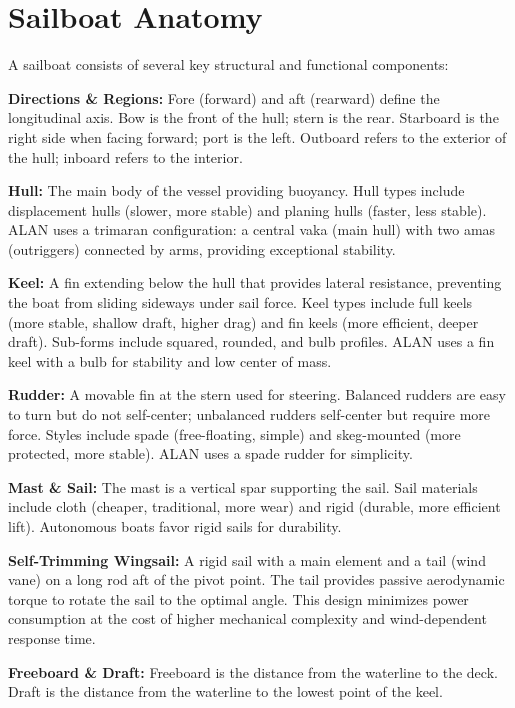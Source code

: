 
\section{Sailboat Anatomy}
\label{app:sailboat_anatomy}

A sailboat consists of several key structural and functional components:

\textbf{Directions \& Regions:} Fore (forward) and aft (rearward) define the longitudinal axis. Bow is the front of the hull; stern is the rear. Starboard is the right side when facing forward; port is the left. Outboard refers to the exterior of the hull; inboard refers to the interior.

\textbf{Hull:} The main body of the vessel providing buoyancy. Hull types include displacement hulls (slower, more stable) and planing hulls (faster, less stable). ALAN uses a trimaran configuration: a central vaka (main hull) with two amas (outriggers) connected by arms, providing exceptional stability.

\textbf{Keel:} A fin extending below the hull that provides lateral resistance, preventing the boat from sliding sideways under sail force. Keel types include full keels (more stable, shallow draft, higher drag) and fin keels (more efficient, deeper draft). Sub-forms include squared, rounded, and bulb profiles. ALAN uses a fin keel with a bulb for stability and low center of mass.

\textbf{Rudder:} A movable fin at the stern used for steering. Balanced rudders are easy to turn but do not self-center; unbalanced rudders self-center but require more force. Styles include spade (free-floating, simple) and skeg-mounted (more protected, more stable). ALAN uses a spade rudder for simplicity.

\textbf{Mast \& Sail:} The mast is a vertical spar supporting the sail. Sail materials include cloth (cheaper, traditional, more wear) and rigid (durable, more efficient lift). Autonomous boats favor rigid sails for durability.

\textbf{Self-Trimming Wingsail:} A rigid sail with a main element and a tail (wind vane) on a long rod aft of the pivot point. The tail provides passive aerodynamic torque to rotate the sail to the optimal angle. This design minimizes power consumption at the cost of higher mechanical complexity and wind-dependent response time.

\textbf{Freeboard \& Draft:} Freeboard is the distance from the waterline to the deck. Draft is the distance from the waterline to the lowest point of the keel.

